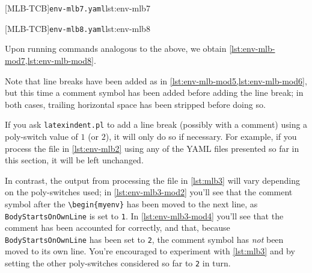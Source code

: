 	\begin{minipage}{.49\textwidth}
		[MLB-TCB]{\texttt{env-mlb7.yaml}}{lst:env-mlb7}
	\end{minipage}
	\hfill
	\begin{minipage}{.49\textwidth}
		[MLB-TCB]{\texttt{env-mlb8.yaml}}{lst:env-mlb8}
	\end{minipage}

	Upon running  commands analogous to the above, we obtain \cref{lst:env-mlb-mod7,lst:env-mlb-mod8}.

	\begin{sidebyside}
		\begin{minipage}{.42\linewidth}
		\end{minipage}
		\hfill
		\begin{minipage}{.57\linewidth}
		\end{minipage}
	\end{sidebyside}

	Note that line breaks have been added as in \cref{lst:env-mlb-mod5,lst:env-mlb-mod6}, but this time a comment symbol
	has been added before adding the line break; in both cases, trailing horizontal
	space has been stripped before doing so.

	If you ask \texttt{latexindent.pl} to add a line break (possibly with a comment) using a poly-switch value of $1$ (or $2$),
	it will only do so if necessary. For example, if you process the file in \vref{lst:env-mlb2} using any of the YAML
	files presented so far in this section, it will be left unchanged.

	\begin{minipage}{.45\linewidth}
	\end{minipage}
	\hfill
	\begin{minipage}{.45\linewidth}
	\end{minipage}

	In contrast, the output from processing the file in \cref{lst:mlb3} will vary depending
	on the poly-switches used; in \cref{lst:env-mlb3-mod2} you'll see that the comment symbol after
	the \lstinline!\begin{myenv}! has been moved to the next line, as \texttt{BodyStartsOnOwnLine}
	is set to \texttt{1}. In \cref{lst:env-mlb3-mod4} you'll see that the comment has been accounted
	for correctly, and that, because \texttt{BodyStartsOnOwnLine} has been set to \texttt{2},
	the comment symbol has \emph{not} been moved to its own line. You're encouraged to experiment
	with \cref{lst:mlb3} and by setting the other poly-switches considered so far to \texttt{2} in turn.

